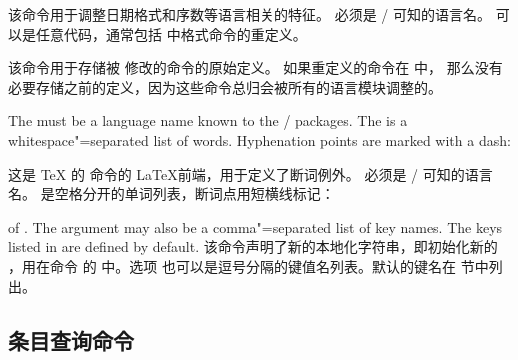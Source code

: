 \begin{ltxsyntax}
该命令用于调整日期格式和序数等语言相关的特征。
 必须是 / 可知的语言名。
 可以是任意代码，通常包括  中格式命令的重定义。



该命令用于存储被  修改的命令的原始定义。
如果重定义的命令在  中，
那么没有必要存储之前的定义，因为这些命令总归会被所有的语言模块调整的。


The  must be a language name known to the / packages. The  is a whitespace"=separated list of words. Hyphenation points are marked with a dash:

这是 \TeX{} 的  命令的 \LaTeX 前端，用于定义了断词例外。
 必须是 / 可知的语言名。
 是空格分开的单词列表，断词点用短横线标记：

\begin{ltxexample}
\end{ltxexample}


 of . The  argument may also be a comma"=separated list of key names. The keys listed in  are defined by default.
该命令声明了新的本地化字符串，即初始化新的 ，用在命令  的  中。选项  也可以是逗号分隔的键值名列表。默认的键名在  节中列出。
\end{ltxsyntax}

\subsection{条目查询命令}%
\label{use:eq}

